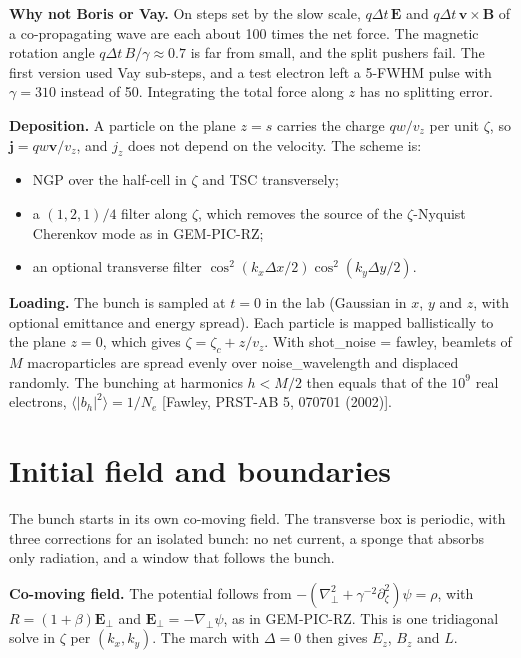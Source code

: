 \documentclass[11pt,a4paper]{article}
\newcommand{\code}[1]{{\fontencoding{OT1}\fontfamily{cmtt}\selectfont #1}}
\begin{document}
\textbf{Why not Boris or Vay.} On steps set by the slow scale, $q\Delta t\,\bm E$ and $q\Delta t\,\bm v\times\bm B$ of a co-propagating wave are each about 100 times the net force. The magnetic rotation angle $q\Delta t\,B/\gamma\approx0.7$ is far from small, and the split pushers fail. The first version used Vay sub-steps, and a test electron left a 5-FWHM pulse with $\gamma=310$ instead of 50. Integrating the total force along $z$ has no splitting error.

\textbf{Deposition.} A particle on the plane $z=s$ carries the charge $qw/v_z$ per unit $\zeta$, so $\bm j=qw\bm v/v_z$, and $j_z$ does not depend on the velocity. The scheme is:
\begin{itemize}
\item NGP over the half-cell in $\zeta$ and TSC transversely;
\item a $(1,2,1)/4$ filter along $\zeta$, which removes the source of the $\zeta$-Nyquist Cherenkov mode as in GEM-PIC-RZ;
\item an optional transverse filter $\cos^2(k_x\Delta x/2)\cos^2(k_y\Delta y/2)$.
\end{itemize}

\textbf{Loading.} The bunch is sampled at $t=0$ in the lab (Gaussian in $x$, $y$ and $z$, with optional emittance and energy spread). Each particle is mapped ballistically to the plane $z=0$, which gives $\zeta=\zeta_c+z/v_z$. With \code{shot\_noise = fawley}, beamlets of $M$ macroparticles are spread evenly over \code{noise\_wavelength} and displaced randomly. The bunching at harmonics $h<M/2$ then equals that of the $10^9$ real electrons, $\langle|b_h|^2\rangle=1/N_e$ [Fawley, PRST-AB 5, 070701 (2002)].

\section{Initial field and boundaries}

The bunch starts in its own co-moving field. The transverse box is periodic, with three corrections for an isolated bunch: no net current, a sponge that absorbs only radiation, and a window that follows the bunch.

\textbf{Co-moving field.} The potential follows from $-(\nabla_\perp^2+\gamma^{-2}\partial_\zeta^2)\psi=\rho$, with $R=(1+\beta)\bm E_\perp$ and $\bm E_\perp=-\nabla_\perp\psi$, as in GEM-PIC-RZ. This is one tridiagonal solve in $\zeta$ per $(k_x,k_y)$. The march with $\Delta=0$ then gives $E_z$, $B_z$ and $L$.
\end{document}
